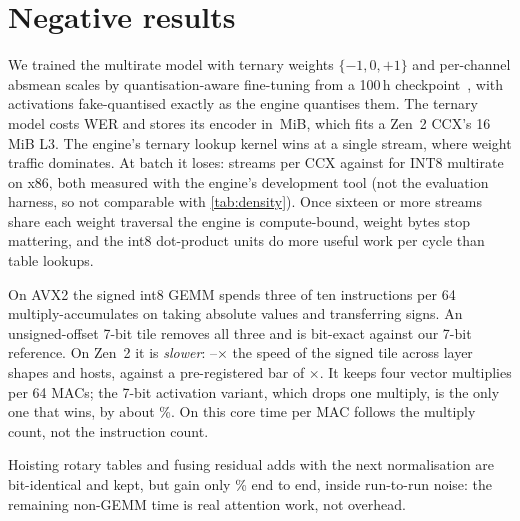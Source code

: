 \section{Negative results}\label{sec:negative}

 We trained the multirate model with
ternary weights $\{-1,0,+1\}$ and per-channel absmean scales by quantisation-aware fine-tuning
from a 100\,h checkpoint~\cite{ma2024bitnet}, with activations fake-quantised exactly as the
engine quantises them. The ternary model costs \TernaryWerCost\pp WER and stores its encoder in
\TernaryMiB\,MiB, which fits a Zen~2 CCX's 16\,MiB L3. The engine's ternary lookup kernel wins at a
single stream, where weight traffic dominates. At batch it loses: \TernaryDenCCX{} streams per CCX
against \IntEightMRDenCCX{} for INT8 multirate on x86, both measured with the engine's development
tool (not the evaluation harness, so not comparable with \cref{tab:density}). Once sixteen or more streams share each weight traversal
the engine is compute-bound, weight bytes stop mattering, and the int8 dot-product units do more
useful work per cycle than table lookups.

 On AVX2 the signed int8 GEMM spends three of
ten instructions per 64 multiply-accumulates on taking absolute values and transferring signs. An
unsigned-offset 7-bit tile removes all three and is bit-exact against our 7-bit reference. On Zen~2 it is
\emph{slower}: \UsevenVsKzeroLo--\UsevenVsKzeroHi{}$\times$ the speed of the signed tile across
layer shapes and hosts, against a pre-registered bar of \UsevenBar$\times$. It keeps four vector
multiplies per 64 MACs; the 7-bit activation variant, which drops one multiply, is the only one that
wins, by about \ActSevenGain\%. On this core time per MAC follows the multiply count, not the
instruction count.

 Hoisting rotary tables and fusing residual adds
with the next normalisation are bit-identical and kept, but gain only \NonGemmGain\% end to end,
inside run-to-run noise: the remaining non-GEMM time is real attention work, not overhead.
